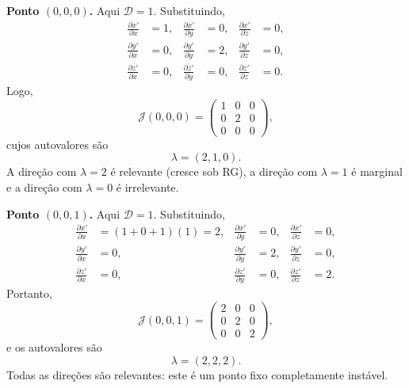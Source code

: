 \documentclass[12pt,a4paper]{article}
\newcommand{\pd}[2]{\frac{\partial #1}{\partial #2}}
\begin{document}
\noindent\textbf{Ponto \((0,0,0)\).}
%
Aqui \(\mathcal D=1\). Substituindo,
%
\begin{align}
    \pd{x'}{x} &= 1, &
    \pd{x'}{y} &= 0, &
    \pd{x'}{z} &= 0,
    \\
    \pd{y'}{x} &= 0, &
    \pd{y'}{y} &= 2, &
    \pd{y'}{z} &= 0,
    \\
    \pd{z'}{x} &= 0, &
    \pd{z'}{y} &= 0, &
    \pd{z'}{z} &= 0.
\end{align}
%
Logo,
%
\begin{equation}
    \mathcal J(0,0,0)
    =
    \begin{pmatrix}
        1 & 0 & 0 \\
        0 & 2 & 0 \\
        0 & 0 & 0
    \end{pmatrix},
\end{equation}
%
cujos autovalores são
%
\begin{equation}
    \boxed{
    \lambda=(2,1,0).
    }
\end{equation}
%
A direção com \(\lambda=2\) é relevante (cresce sob RG), a direção
com \(\lambda=1\) é marginal e a direção com \(\lambda=0\) é
irrelevante.

\noindent\textbf{Ponto \((0,0,1)\).}
%
Aqui \(\mathcal D=1\). Substituindo,
%
\begin{align}
    \pd{x'}{x} &= (1+0+1)(1)=2, &
    \pd{x'}{y} &= 0, &
    \pd{x'}{z} &= 0,
    \\
    \pd{y'}{x} &= 0, &
    \pd{y'}{y} &= 2, &
    \pd{y'}{z} &= 0,
    \\
    \pd{z'}{x} &= 0, &
    \pd{z'}{y} &= 0, &
    \pd{z'}{z} &= 2.
\end{align}
%
Portanto,
%
\begin{equation}
    \mathcal J(0,0,1)
    =
    \begin{pmatrix}
        2 & 0 & 0 \\
        0 & 2 & 0 \\
        0 & 0 & 2
    \end{pmatrix},
\end{equation}
%
e os autovalores são
%
\begin{equation}
    \boxed{
    \lambda=(2,2,2).
    }
\end{equation}
%
Todas as direções são relevantes: este é um ponto fixo completamente
instável.
\end{document}
